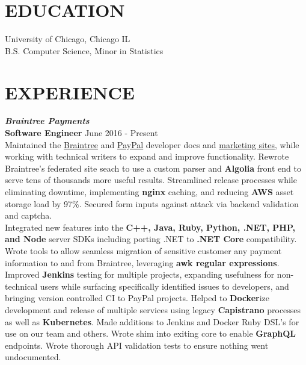 \documentclass[line,margin]{res}
\begin{document}
\address{4322 N Hoyne Ave. 1N\\ Chicago IL 60618\\ 612-701-4272\\jellenberger@uchicago.edu\\ellenberger.zone}

\begin{resume}
\section{EDUCATION}
University of Chicago, Chicago IL \hfill \\
B.S. Computer Science, Minor in Statistics
 
\section{EXPERIENCE}
\textbf{\textit{Braintree Payments}}\\
\textbf{Software Engineer} \hfill June 2016 - Present\\
Maintained the \href{https://developers.braintreepayments.com}{Braintree} and \href{https://developer.paypal.com}{PayPal} developer docs and \href{https://braintreepayments.com}{marketing sites}, while working with technical writers to expand and improve functionality.  Rewrote Braintree's federated site seach to use a custom parser and \textbf{Algolia} front end to serve tens of thousands more useful results. Streamlined release processes while eliminating downtime, implementing \textbf{nginx} caching, and reducing \textbf{AWS} asset storage load by 97\%. Secured form inputs against attack via backend validation and captcha.\\
Integrated new features into the \textbf{C++, Java, Ruby, Python, .NET, PHP, and Node} server SDKs including porting .NET to \textbf{.NET Core} compatibility. Wrote tools to allow seamless migration of sensitive customer any payment information to and from Braintree, leveraging \textbf{awk regular expressions}. Improved \textbf{Jenkins} testing for multiple projects, expanding usefulness for non-technical users while surfacing specifically identified issues to developers, and bringing version controlled CI to PayPal projects. Helped to \textbf{Docker}ize development and release of multiple services using legacy \textbf{Capistrano} processes as well as \textbf{Kubernetes}. Made additions to Jenkins and Docker Ruby DSL's for use on our team and others. Wrote shim into exiting core to enable \textbf{GraphQL} endpoints. Wrote thorough API validation tests to ensure nothing went undocumented.\\

\end{resume}
\end{document}
